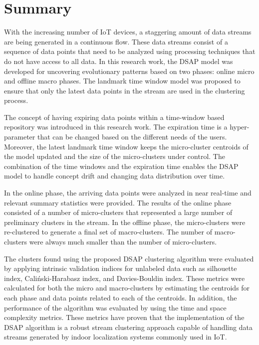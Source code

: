 \section{Summary}

With the increasing number of IoT devices, a staggering amount of data streams are being generated in a continuous flow. These data streams consist of a sequence of data points that need to be analyzed using processing techniques that do not have access to all data. In this research work, the DSAP model was developed for uncovering evolutionary patterns based on two phases: online micro and offline macro phases. The landmark time window model was proposed to ensure that only the latest data points in the stream are used in the clustering process.

The concept of having expiring data points within a time-window based repository was introduced in this research work. The expiration time is a hyper-parameter that can be changed based on the different needs of the users. Moreover, the latest landmark time window keeps the micro-cluster centroids of the model updated and the size of the micro-clusters under control. The combination of the time windows and the expiration time enables the DSAP model to handle concept drift and changing data distribution over time.

In the online phase, the arriving data points were analyzed in near real-time and relevant summary statistics were provided. The results of the online phase consisted of a number of micro-clusters that represented a large number of preliminary clusters in the stream. In the offline phase, the micro-clusters were re-clustered to generate a final set of macro-clusters. The number of macro-clusters were always much smaller than the number of micro-clusters.

The clusters found using the proposed DSAP clustering algorithm were evaluated by applying intrinsic validation indices for unlabeled data such as silhouette index, Caliński-Harabasz index, and Davies-Bouldin index. These metrics were calculated for both the micro and macro-clusters by estimating the centroids for each phase and data points related to each of the centroids. In addition, the performance of the algorithm was evaluated by using the time and space complexity metrics. These metrics have proven that the implementation of the DSAP algorithm is a robust stream clustering approach capable of handling data streams generated by indoor localization systems commonly used in IoT.

